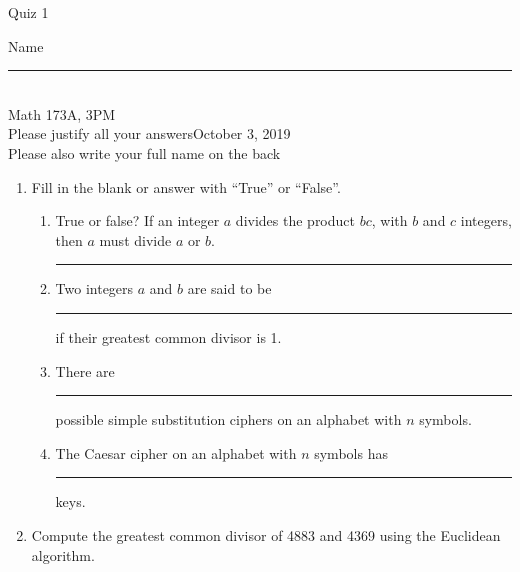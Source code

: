\documentclass[12pt]{article}
\begin{document}
\begin{flushleft} 
\centerline{\LARGE{Quiz 1}} 
\vspace{5 mm}
{Name \rule {2 in}{0.01in}}\\
Math 173A, 3PM
\\
{Please justify all your answers}\hfill {October 3, 2019}
\\
{Please also write your full name on the back} 

\medskip
\end{flushleft}

\begin{enumerate}
	\item Fill in the blank or answer with ``True'' or ``False''.
	\begin{enumerate}
		\item True or false? If an integer $a$ divides the product $bc$, with $b$ and $c$ integers, then $a$ must divide $a$ or $b$. \rule{1cm}{.15mm}
		\item Two integers $a$ and $b$ are said to be \rule{2.5cm}{.15mm} if their greatest common divisor is 1.
		\item There are \rule{2.5cm}{.15mm} possible simple substitution ciphers on an alphabet with $n$ symbols.
		\item The Caesar cipher on an alphabet with $n$ symbols has \rule{2.5cm}{.15mm} keys.
	\end{enumerate}
	\vfill

	\item Compute the greatest common divisor of 4883 and 4369 using the Euclidean algorithm.
	\vfill

\end{enumerate}

\end{document}
